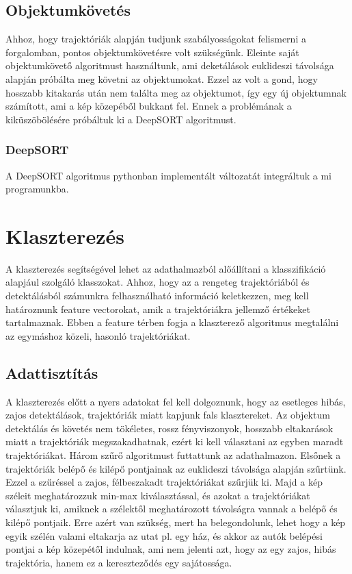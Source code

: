 \documentclass[acmtog, authorversion]{acmart}
\begin{document}
\subsection{Objektumkövetés}
Ahhoz, hogy trajektóriák alapján tudjunk szabályosságokat felismerni a forgalomban, pontos objektumkövetésre volt szükségünk. Eleinte
saját objektumkövető algoritmust használtunk, ami deketálások euklideszi távolsága alapján próbálta meg követni az objektumokat.
Ezzel az volt a gond, hogy hosszabb kitakarás után nem találta meg az objektumot, így egy új objektumnak számított, ami a kép
közepéből bukkant fel. Ennek a problémának a kiküszöbölésére próbáltuk ki a DeepSORT algoritmust.
\subsubsection{DeepSORT}
A DeepSORT algoritmus pythonban implementált változatát integráltuk a mi programunkba.

\section{Klaszterezés}
A klaszterezés segítségével lehet az adathalmazból alőállítani a klasszifikáció alapjául szolgáló klasszokat. Ahhoz, hogy az
a rengeteg trajektóriából és detektálásból számunkra felhasználható információ keletkezzen, meg kell határoznunk feature
vectorokat, amik a trajektóriákra jellemző értékeket tartalmaznak. Ebben a feature térben fogja a klaszterező algoritmus
megtalálni az egymáshoz közeli, hasonló trajektóriákat.
\subsection{Adattisztítás}
A klaszterezés előtt a nyers adatokat fel kell dolgoznunk, hogy az esetleges hibás, zajos detektálások, trajektóriák miatt
kapjunk fals klasztereket. Az objektum detektálás és követés nem tökéletes, rossz fényviszonyok, hosszabb eltakarások miatt 
a trajektóriák megszakadhatnak, ezért ki kell választani az egyben maradt trajektóriákat. Három szűrő algoritmust futtattunk 
az adathalmazon. Elsőnek a trajektóriák belépő és kilépő pontjainak az euklideszi távolsága alapján szűrtünk. Ezzel a szűréssel a zajos, félbeszakadt trajektóriákat szűrjük ki.
Majd a kép széleit meghatározzuk min-max kiválasztással, és azokat a trajektóriákat választjuk ki, amiknek a szélektől meghatározott
távolságra vannak a belépő és kilépő pontjaik. Erre azért van szükség, mert ha belegondolunk, lehet hogy a kép egyik szélén valami eltakarja az utat pl. egy ház, és akkor az autók belépési pontjai a kép közepétől indulnak, ami nem jelenti azt, hogy az egy zajos, hibás trajektória, hanem ez a kereszteződés egy sajátossága. 
\end{document}
